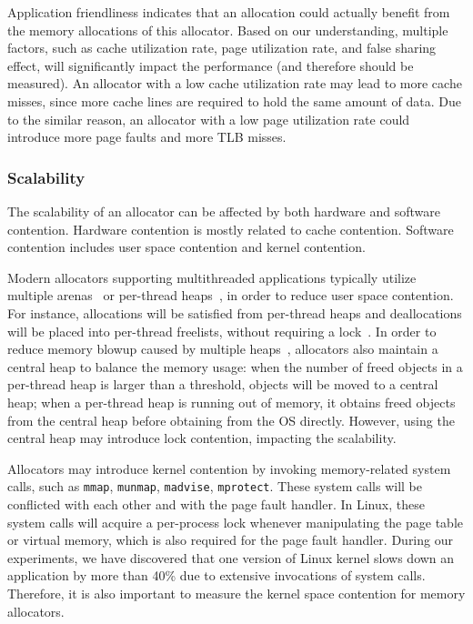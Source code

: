 Application friendliness indicates that an allocation could actually benefit from the memory allocations of this allocator. Based on our understanding, multiple factors, such as cache utilization rate, page utilization rate, and false sharing effect, will significantly impact the performance (and therefore should be measured). An allocator with a low cache utilization rate may lead to more cache misses, since more cache lines are required to hold the same amount of data. Due to the similar reason, an allocator with a low page utilization rate could introduce more page faults and more TLB misses. 

\subsubsection{Scalability} 
\label{sec:scalability}

The scalability of an allocator can be affected by both hardware and software contention. Hardware contention is mostly related to cache contention. Software contention includes user space contention and kernel contention. 

Modern allocators supporting multithreaded applications typically utilize multiple arenas~\cite{dlmalloc} or per-thread heaps~\cite{Hoard}, in order to reduce user space contention. For instance, allocations will be satisfied from per-thread heaps and deallocations will be placed into per-thread freelists, without requiring a lock~\cite{TcMalloc, jemalloc}. In order to reduce memory blowup caused by multiple heaps~\cite{Hoard}, allocators also maintain a central heap to balance the memory usage: when the number of freed objects in a per-thread heap is larger than a threshold, objects will be moved to a central heap; when a per-thread heap is running out of memory, it obtains freed objects from the central heap before obtaining from the OS directly. However, using the central heap may introduce lock contention, impacting the scalability.  

 
 Allocators may introduce kernel contention by invoking memory-related system calls, such as \texttt{mmap}, \texttt{munmap}, \texttt{madvise}, \texttt{mprotect}. These system calls will be conflicted with each other and with the page fault handler.  In Linux, these system calls will acquire a per-process lock whenever manipulating the page table or virtual memory, which is also required for the page fault handler. During our experiments, we have discovered that one version of Linux kernel slows down an application by more than 40\% due to extensive invocations of system calls. Therefore, it is also important to measure the kernel space contention for memory allocators.
 
